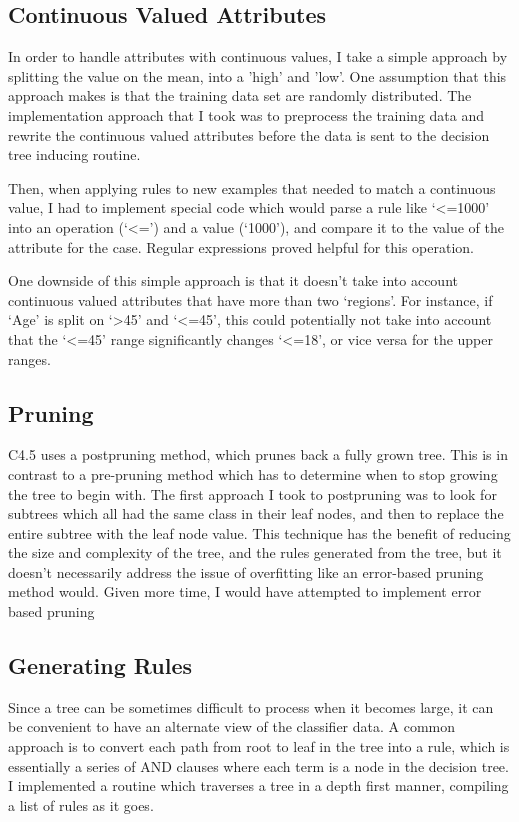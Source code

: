 \documentclass[letterpaper]{article}
\begin{document}
\subsection{Continuous Valued Attributes}

In order to handle attributes with continuous values, 
I take a simple approach by splitting the value on the mean, into a 
'high' and 'low'.  One assumption that this approach makes is that the training 
data set are randomly distributed. The implementation approach that I took was 
to preprocess the training data and rewrite the continuous valued attributes 
before the data is sent to the decision tree inducing routine.

Then, when applying rules to new examples that needed to match a continuous value,
I had to implement special code which would parse a rule like `<=1000' into 
an operation (`<=') and a value (`1000'), and compare it to the value of the
attribute for the case. Regular expressions proved helpful for this operation.

One downside of this simple approach is that it doesn't take into account
continuous valued attributes that have more than two `regions'. For instance,
if `Age' is split on `>45' and `<=45', this could potentially not take into 
account that the `<=45' range significantly changes `<=18', or vice versa for
the upper ranges.

\subsection{Pruning}
C4.5 uses a postpruning method, which prunes back a fully grown tree. 
This is in contrast to a pre-pruning method which has to determine when to stop 
growing the tree to begin with. The first approach I took to postpruning was 
to look for subtrees which all had the same class in their leaf nodes, and then 
to replace the entire subtree with the leaf node value. This technique has the 
benefit of reducing the size and complexity of the tree, and the rules 
generated from the tree, but it doesn't necessarily address the issue of 
overfitting like an error-based pruning method would. 
Given more time, I would have attempted to implement error based pruning 

\subsection{Generating Rules}
Since a tree can be sometimes difficult to process when it becomes large, it 
can be convenient to have an alternate view of the classifier data. 
A common approach is to convert each path from root to leaf in the tree into 
a rule, which is essentially a series of AND clauses where each term 
is a node in the decision tree. I implemented a routine which traverses a tree in a depth first manner, 
compiling a list of rules as it goes. 
\end{document}
